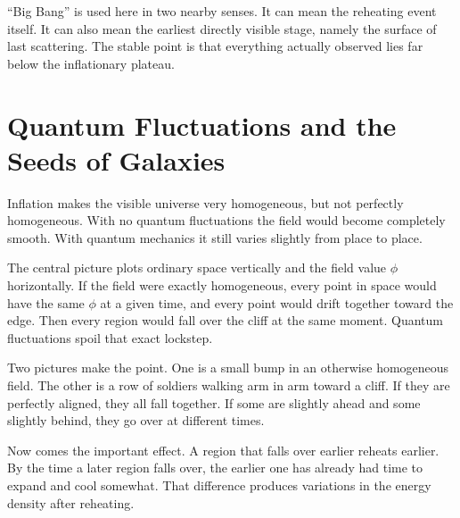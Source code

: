 ``Big Bang'' is used here in two nearby senses. It can mean the reheating event itself. It can also mean the earliest directly visible stage, namely the surface of last scattering. The stable point is that everything actually observed lies far below the inflationary plateau.

\begin{classroomqa}
\end{classroomqa}

\section{Quantum Fluctuations and the Seeds of Galaxies}

Inflation makes the visible universe very homogeneous, but not perfectly homogeneous. With no quantum fluctuations the field would become completely smooth. With quantum mechanics it still varies slightly from place to place.

The central picture plots ordinary space vertically and the field value \(\phi\) horizontally. If the field were exactly homogeneous, every point in space would have the same \(\phi\) at a given time, and every point would drift together toward the edge. Then every region would fall over the cliff at the same moment. Quantum fluctuations spoil that exact lockstep.

Two pictures make the point. One is a small bump in an otherwise homogeneous field. The other is a row of soldiers walking arm in arm toward a cliff. If they are perfectly aligned, they all fall together. If some are slightly ahead and some slightly behind, they go over at different times.

Now comes the important effect. A region that falls over earlier reheats earlier. By the time a later region falls over, the earlier one has already had time to expand and cool somewhat. That difference produces variations in the energy density after reheating.

\begin{classroomqa}
\end{classroomqa}

